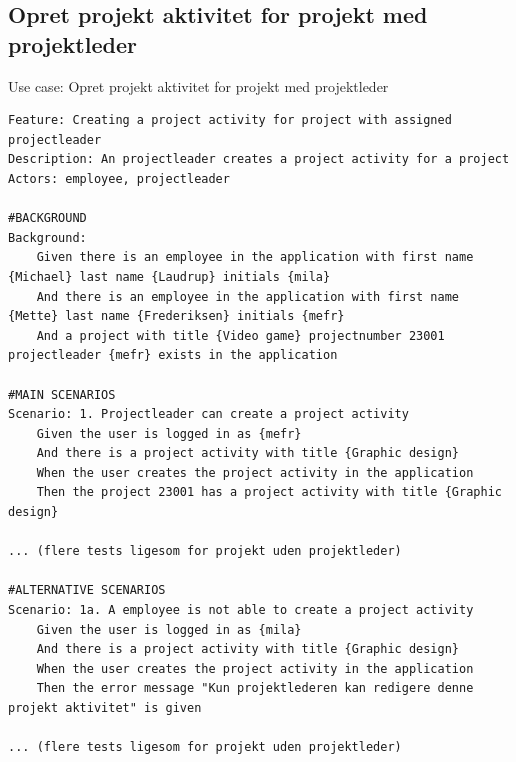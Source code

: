 \subsection{Opret projekt aktivitet for projekt med projektleder} 
\begin{listing}[H]
    \centering
    \caption{Use case: Opret projekt aktivitet for projekt med projektleder} \label{lst:usecase_project_activity_with_leader}
    \begin{verbatim}  
Feature: Creating a project activity for project with assigned projectleader
Description: An projectleader creates a project activity for a project
Actors: employee, projectleader

#BACKGROUND
Background:
    Given there is an employee in the application with first name {Michael} last name {Laudrup} initials {mila}
    And there is an employee in the application with first name {Mette} last name {Frederiksen} initials {mefr}
    And a project with title {Video game} projectnumber 23001 projectleader {mefr} exists in the application

#MAIN SCENARIOS
Scenario: 1. Projectleader can create a project activity
    Given the user is logged in as {mefr}
    And there is a project activity with title {Graphic design}  
    When the user creates the project activity in the application 
    Then the project 23001 has a project activity with title {Graphic design} 

... (flere tests ligesom for projekt uden projektleder)

#ALTERNATIVE SCENARIOS
Scenario: 1a. A employee is not able to create a project activity
    Given the user is logged in as {mila}
    And there is a project activity with title {Graphic design}  
    When the user creates the project activity in the application 
    Then the error message "Kun projektlederen kan redigere denne projekt aktivitet" is given
    
... (flere tests ligesom for projekt uden projektleder)

    \end{verbatim}
\end{listing}

